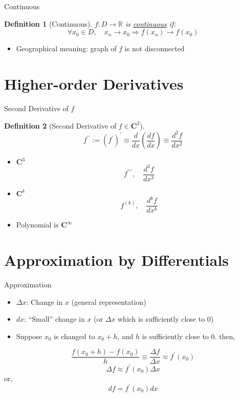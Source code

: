 \documentclass[a4paper,11pt]{article}
\newtheorem{defn}{Definition}
\begin{document}
\begin{frame}[t]{Continuous}
	\begin{defn}
		[Continuous]
		$f:D\rightarrow \mathbb{R}$ is \uline{continuous} if:\[
			\forall x_0 \in D,\quad x_n \rightarrow x_0 \Rightarrow f(x_n)\rightarrow f(x_0)
		\]
	\end{defn}
	\begin{itemize}
		\item Geographical meaning: graph of $f$ is not disconnected
	\end{itemize}
\end{frame}


\section{Higher-order Derivatives} %
\label{sec:higher_order_derivatives}

\begin{frame}[t]{Second Derivative of $f$}
	\begin{defn}
		[Second Derivative of $f\in \mathbf{C}^2$]
		\[
			f^{\prime\prime} := (f^\prime)^\prime \equiv \frac{d}{dx}\left(\frac{df}{dx}\right) \equiv \frac{d^2f}{dx^2}
		\]
	\end{defn}
	\begin{itemize}
		\item $\mathbf{C}^3$
		\[
			f^{\prime\prime\prime},\quad \frac{d^3f}{dx^3}
		\]
		\item $\mathbf{C}^k$
		\[
			f^{(k)},\quad \frac{d^kf}{dx^k}
		\]
		\item Polynomial is $\mathbf{C}^\infty$
	\end{itemize}
\end{frame}

\section{Approximation by Differentials} %
\label{sec:approximation_by_differentials}


\begin{frame}[t]{Approximation}
	\begin{itemize}
		\item $\Delta x$: Change in $x$ (general representation)
		\item $dx$: ``Small'' change in $x$ (or $\Delta x$ which is sufficiently close to 0)
		\item Suppose $x_0$ is changed to $x_0+h$, and $h$ is sufficiently close to 0. then, 
	\end{itemize}
	\[
		\frac{f(x_0+h)-f(x_0)}{h}\equiv \frac{\Delta f}{\Delta x} \approx f^\prime (x_0)
	\]
	\[
		\Delta f \approx f^\prime (x_0) \Delta x
	\] or, \[
		df = f^\prime (x_0) dx
	\]
\end{frame}
\end{document}
